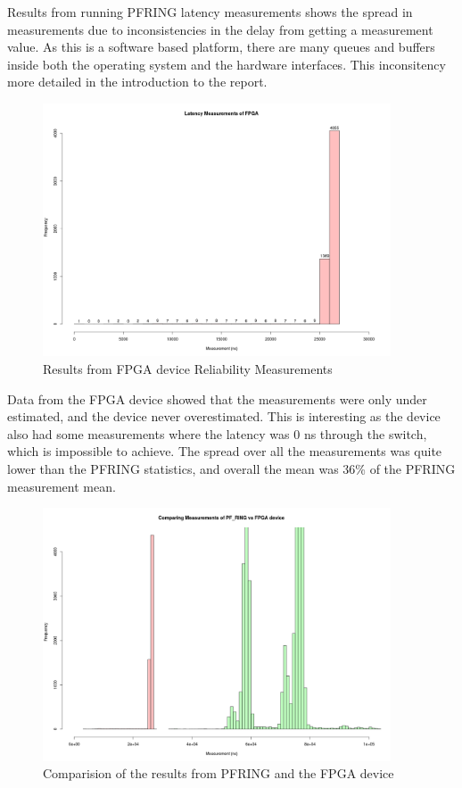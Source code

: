 Results from running PF\textunderscore RING latency measurements shows the spread in measurements due to 
inconsistencies in the delay from getting a measurement value. As this is a software based platform, there are many 
queues and buffers inside both the operating system and the hardware interfaces. This inconsitency more detailed in 
the introduction to the report.

\begin{figure}[H]
    \begin{center}
        \includegraphics[keepaspectratio,height=7.5cm]{Images/TestPlot}
        \caption{Results from FPGA device Reliability Measurements}
        \label{fig:Test2Plot}
    \end{center}
\end{figure}

Data from the FPGA device showed that the measurements were only under estimated, and the device never overestimated.
This is interesting as the device also had some measurements where the latency was 0 ns through the switch, which is 
impossible to achieve. The spread over all the measurements was quite lower than the PF\textunderscore RING 
statistics, and overall the mean was 36\% of the PF\textunderscore RING measurement mean. 

\begin{figure}[H]
    \begin{center}
        \includegraphics[keepaspectratio,height=7.5cm]{Images/Comparision}
        \caption{Comparision of the results from PF\textunderscore RING and the FPGA device}
        \label{fig:comparision}
    \end{center}
\end{figure}

